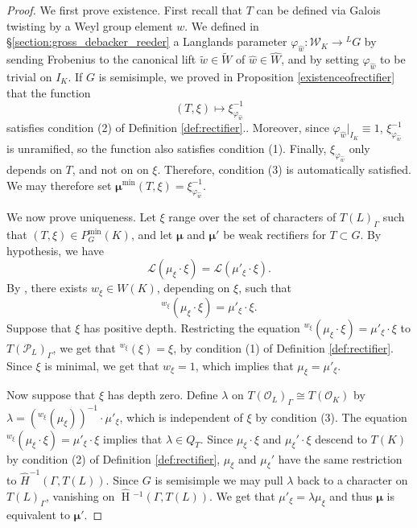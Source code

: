\documentclass[11pt]{amsart}
\theoremstyle{plain}
\newcommand{\HT}[1]{\hat{\HH}{}^{#1}}
\theoremstyle{definition}
\DeclareMathOperator{\HH}{H}
\newcommand{\OK}{\mathcal{O}_K}
\newcommand{\PL}{\mathcal{P}_L}
\newcommand{\OL}{\mathcal{O}_L}
\newcommand{\Weil}{\mathcal{W}}
\newcommand{\Lpack}{\mathcal{L}}
\newcommand{\Pmin}{P_G^{\min}}
\newcommand{\bmu}{\boldsymbol\mu}
\newcommand{\mumin}{\bmu^{\min}}
\begin{document}
\begin{proof}
We first prove existence.
First recall that $T$ can be defined
via Galois twisting by a Weyl group element $w$.  We defined in
\S\ref{section:gross_debacker_reeder}
a Langlands parameter $\varphi_{\hat{w}} :\Weil _K \rightarrow {}^L G$ by
sending Frobenius to the canonical lift
$\tilde{w} \in \widetilde{W}$ of $\hat{w} \in \hat{W}$, and by setting
$\varphi_{\hat{w}}$ to be trivial on $I_K$.
If $G$ is semisimple,
we proved in Proposition \ref{existenceofrectifier}
that the function $$(T, \xi) \mapsto \xi_{\varphi_{\hat{w}}}^{-1}$$
satisfies condition (2) of Definition \ref{def:rectifier}..  Moreover, since $\varphi_{\hat{w}}|_{I_K} \equiv 1$,
$\xi_{\varphi_{\hat{w}}}^{-1}$ is unramified, so the function also
satisfies condition (1).  Finally, $\xi_{\varphi_{\hat{w}}}$ only depends on $T$,
and not on on $\xi$.  Therefore, condition (3) is automatically satisfied.
We may therefore set
$\mumin(T,\xi) = \xi_{\varphi_{\hat{w}}}^{-1}$.

We now prove uniqueness.
Let $\xi$ range over the set of characters of $T(L)_{\Gamma}$
such that $(T, \xi) \in \Pmin(K)$, and let
$\bmu$ and $\bmu'$ be weak rectifiers for
$T \subset G$.  By hypothesis, we have
$$\Lpack(\mu_{\xi} \cdot \xi) = \Lpack(\mu'_{\xi} \cdot \xi).$$
By \cite[\S10]{murnaghan:11}, there exists $w_{\xi} \in W(K)$,
depending on $\xi$, such that
$${}^{w_{\xi}} (\mu_\xi \cdot \xi) = \mu'_\xi \cdot \xi.$$
Suppose that $\xi$ has positive depth.
Restricting the equation
${}^{w_\xi} (\mu_\xi \cdot \xi) = \mu'_\xi \cdot \xi$
to $T(\PL)_{\Gamma}$, we get that ${}^{w_{\xi}} (\xi) = \xi$,
by condition (1) of Definition \ref{def:rectifier}.
Since $\xi$ is minimal, we get that $w_{\xi} = 1$, which implies
that $\mu_{\xi} = \mu'_{\xi}$.

Now suppose that $\xi$ has depth zero.
Define $\lambda$ on $T(\OL)_{\Gamma} \cong T(\OK)$ by $\lambda = ({}^{w_\xi} (\mu_\xi))^{-1} \cdot \mu'_\xi$,
which is independent of $\xi$ by condition (3). The equation ${}^{w_\xi} (\mu_\xi \cdot \xi) = \mu'_\xi \cdot \xi$
implies that $\lambda \in Q_T$.  Since $\mu_\xi \cdot \xi$ and $\mu_\xi' \cdot \xi$ descend to
$T(K)$ by condition (2) of Definition \ref{def:rectifier}, $\mu_\xi$ and $\mu_\xi'$ have the
same restriction to $\hat{H}^{-1}(\Gamma, T(L))$.  Since $G$ is semisimple we may pull $\lambda$ back to
a character on $T(L)_\Gamma$, vanishing on $\HT{-1}(\Gamma, T(L))$.  We get that $\mu'_\xi = \lambda\mu_\xi$
and thus $\bmu$ is equivalent to $\bmu'$.
\end{proof}
\end{document}
